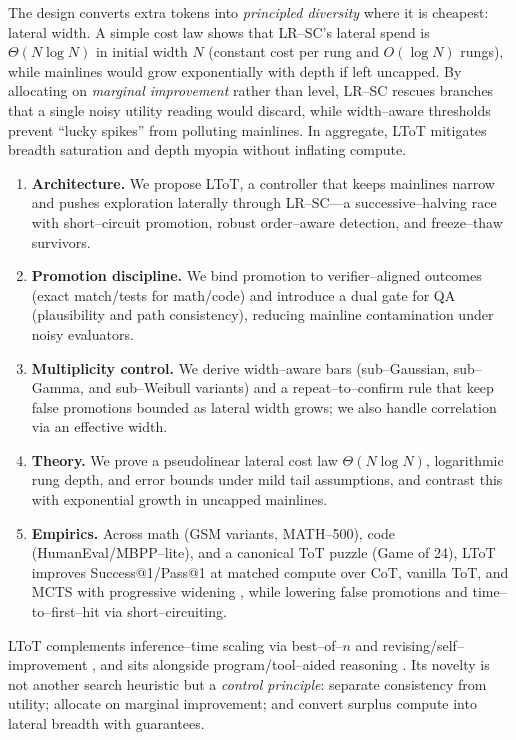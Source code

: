 \documentclass{article}
\begin{document}
The design converts extra tokens into \emph{principled diversity} where it is cheapest: lateral width.
A simple cost law shows that LR--SC's lateral spend is $\Theta(N\log N)$ in initial width $N$ (constant cost per rung and $O(\log N)$ rungs), while mainlines would grow exponentially with depth if left uncapped.
By allocating on \emph{marginal improvement} rather than level, LR--SC rescues branches that a single noisy utility reading would discard, while width--aware thresholds prevent ``lucky spikes'' from polluting mainlines.
In aggregate, LToT mitigates breadth saturation and depth myopia without inflating compute.

\begin{enumerate}[leftmargin=*, itemsep=2pt, topsep=2pt]
    \item \textbf{Architecture.} We propose LToT, a controller that keeps mainlines narrow and pushes exploration laterally through LR--SC---a successive--halving race with short--circuit promotion, robust order--aware detection, and freeze--thaw survivors.
    \item \textbf{Promotion discipline.} We bind promotion to verifier--aligned outcomes (exact match/tests for math/code) and introduce a dual gate for QA (plausibility and path consistency), reducing mainline contamination under noisy evaluators.
    \item \textbf{Multiplicity control.} We derive width--aware bars (sub--Gaussian, sub--Gamma, and sub--Weibull variants) and a repeat--to--confirm rule that keep false promotions bounded as lateral width grows; we also handle correlation via an effective width.
    \item \textbf{Theory.} We prove a pseudolinear lateral cost law $\Theta(N\log N)$, logarithmic rung depth, and error bounds under mild tail assumptions, and contrast this with exponential growth in uncapped mainlines.
    \item \textbf{Empirics.} Across math (GSM variants, MATH--500), code (HumanEval/MBPP--lite), and a canonical ToT puzzle (Game of 24), LToT improves Success@1/Pass@1 at matched compute over CoT, vanilla ToT, and MCTS with progressive widening \citep{xie2024mcts}, while lowering false promotions and time--to--first--hit via short--circuiting.
\end{enumerate}

LToT complements inference--time scaling via best--of--$n$ \citep{chen2024bot,yang2024bot} and revising/self--improvement \citep{madaan2023selfrefine}, and sits alongside program/tool--aided reasoning \citep{gao2022pal,chen2022pot}.
Its novelty is not another search heuristic but a \emph{control principle}: separate consistency from utility; allocate on marginal improvement; and convert surplus compute into lateral breadth with guarantees.
\end{document}
